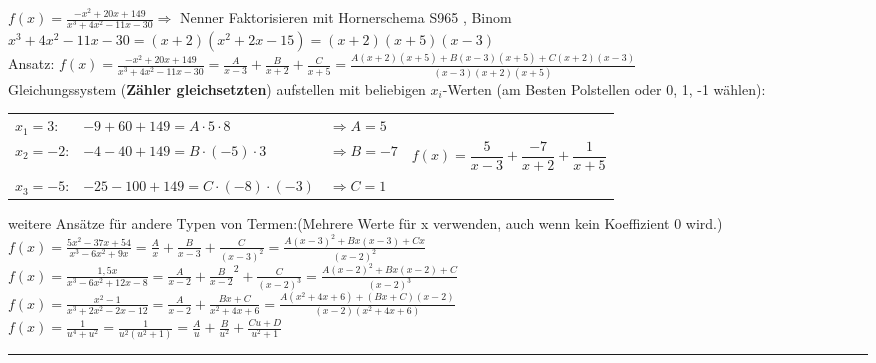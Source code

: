 \documentclass[6pt,a4paper]{scrartcl}
\begin{document}
\begin{multicols*}{2}
$f(x)= \frac{-x^{2}+20x+149}{x^{3}+4x^{2}-11x-30} \Rightarrow$ Nenner Faktorisieren mit Hornerschema \color{red} S965 \color{black}, Binom\\ $x^{3}+4x^{2}-11x-30=(x+2)(x^{2}+2x-15)=(x+2)(x+5)(x-3)$ \\
Ansatz: $ f(x)= \frac{-x^{2}+20x+149}{x^{3}+4x^{2}-11x-30}=\frac{A}{x-3}+\frac{B}{x+2}+\frac{C}{x+5}=\frac{A(x+2)(x+5)+B(x-3)(x+5)+C(x+2)(x-3)}{(x-3)(x+2)(x+5)} $\\
Gleichungssystem (\textbf{Zähler gleichsetzten}) aufstellen mit beliebigen $x_{i}$-Werten (am Besten Polstellen oder 0, 1, -1 wählen):

\begin{tabulary}{12cm}{llll}
	
	$x_{1}=3$: 		& $-9+60+149=A\cdot 5\cdot 8$ 			& 	$\Rightarrow A=5$ 	&		\\
	$x_{2}=-2$:		&  $-4-40+149=B\cdot(-5)\cdot 3$ 		& 	$\Rightarrow B=-7$	&	$f(x)=\dfrac{5}{x-3}+\dfrac{-7}{x+2}+\dfrac{1}{x+5}$		\\ 
	$x_{3}=-5$: 	&  $-25-100+149=C\cdot (-8)\cdot (-3)$ 	& 	$\Rightarrow C=1$	&			\\

\end{tabulary}

weitere Ansätze für andere Typen von Termen:(Mehrere Werte für x verwenden, auch wenn kein Koeffizient 0 wird.)\\

$f(x)=\frac{5x^{2}-37x+54}{x^{3}-6x^{2}+9x}=\frac{A}{x}+\frac{B}{x-3}+\frac{C}{(x-3)^{2}}=\frac{A(x-3)^{2}+Bx(x-3)+Cx}{(x-2)^{2}}$\\

$f(x)=\frac{1,5x}{x^{3}-6x^{2}+12x-8}=\frac{A}{x-2}+\frac{B}{x-2}^{2}+\frac{C}{(x-2)^{3}}=\frac{A(x-2)^{2}+Bx(x-2)+C}{(x-2)^{3}}$\\


$f(x)=\frac{x^{2}-1}{x^{3}+2x^{2}-2x-12}=\frac{A}{x-2}+\frac{Bx+C}{x^{2}+4x+6}=\frac{A(x^{2}+4x+6)+(Bx+C)(x-2)}{(x-2)(x^{2}+4x+6)}$\\

$ f(x)=\frac{1}{u^{4}+u^{2}} = \frac{1}{u^{2}(u^{2}+1)}= \frac{A}{u}+\frac{B}{u^{2}}+ \frac{Cu+D}{u^{2}+1} $	

\hrule



\end{multicols*}
\end{document}

